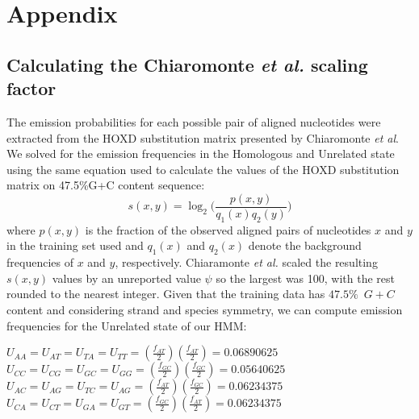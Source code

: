 %
\chapter*{Appendix}
\section*{Calculating the Chiaromonte \textit{et al.} scaling factor}
The emission probabilities for
each possible pair of aligned nucleotides were extracted from the HOXD
substitution matrix presented by Chiaromonte \textit{et al}\cite{hoxd}.
We solved for the emission frequencies in the
Homologous and Unrelated state using the same equation used to
calculate the values of the HOXD substitution matrix on 47.5\%G+C
content sequence\cite{hoxd}:
\begin{equation}
s(x,y)= \log_{2}{\Bigg(\frac{p(x,y)}{q_{1}(x)q_{2}(y)}\Bigg)}
\end{equation}
{w}here $p(x,y)$ is the fraction of the observed aligned pairs of
nucleotides $x$ and $y$ in the training set used and $q_{1}(x)$ and
$q_{2}(x)$ denote the background frequencies of $x$ and $y$,
respectively. Chiaramonte \textit{et al.} scaled the resulting
$s(x,y)$ values by an unreported value $\psi$ so the largest was 100,
with the rest rounded to the nearest integer.  Given that the training
data has $47.5\%$~$G+C$ content and considering strand and species
symmetry, we can compute emission frequencies for the Unrelated state
of our HMM:
\begin{center}$U_{AA}=U_{AT}=U_{TA}=U_{TT}=(\frac{f_{AT}}{2})(\frac{f_{AT}}{2})
= 0.06890625$ \\
$U_{CC}=U_{CG}=U_{GC}=U_{GG}=(\frac{f_{GC}}{2})(\frac{f_{GC}}{2}) =
0.05640625$ \\
$U_{AC}=U_{AG}=U_{TC}=U_{AG}=(\frac{f_{AT}}{2})(\frac{f_{GC}}{2}) =
0.06234375$ \\
$U_{CA}=U_{CT}=U_{GA}=U_{GT}=(\frac{f_{GC}}{2})(\frac{f_{AT}}{2}) =
0.06234375$ \\
\end{center}

